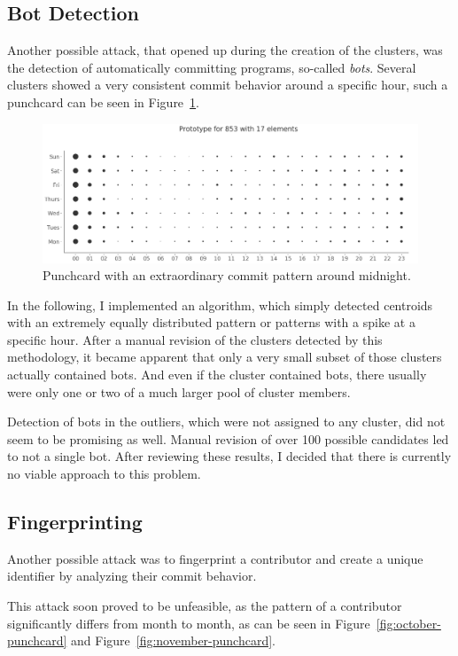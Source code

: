 \subsection{Bot Detection}
Another possible attack, that opened up during the creation of the clusters, was the detection of automatically committing programs, so-called \emph{bots}.
Several clusters showed a very consistent commit behavior around a specific hour, such a punchcard can be seen in Figure~\ref{fig:bot-punchcard}.

\begin{figure}[H]
    \includegraphics[scale=0.32]{./graphs/analysis/bot-punchcard}
    \centering
    \caption{Punchcard with an extraordinary commit pattern around midnight.}\label{fig:bot-punchcard}
\end{figure}

In the following, I implemented an algorithm, which simply detected centroids with an extremely equally distributed pattern or patterns with a spike at a specific hour.
After a manual revision of the clusters detected by this methodology, it became apparent that only a very small subset of those clusters actually contained bots.
And even if the cluster contained bots, there usually were only one or two of a much larger pool of cluster members.

Detection of bots in the outliers, which were not assigned to any cluster, did not seem to be promising as well.
Manual revision of over 100 possible candidates led to not a single bot.
After reviewing these results, I decided that there is currently no viable approach to this problem.


\subsection{Fingerprinting}
Another possible attack was to fingerprint a contributor and create a unique identifier by analyzing their commit behavior.

This attack soon proved to be unfeasible, as the pattern of a contributor significantly differs from month to month, as can be seen in Figure~\ref{fig:october-punchcard} and Figure~\ref{fig:november-punchcard}.

